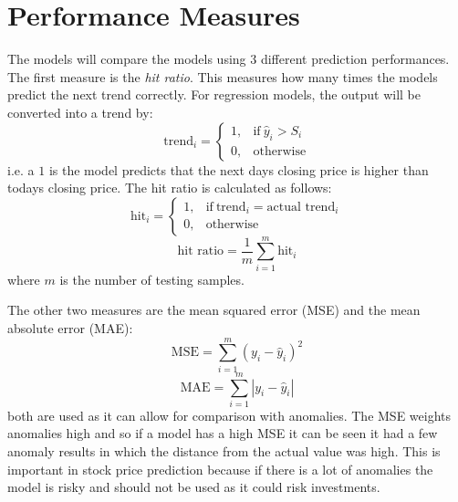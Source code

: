 \documentclass[11pt,a4paper]{article}
\numberwithin{equation}{section}
\begin{document}
\section{Performance Measures}
\label{ss:pm}
The models will compare the models using 3 different prediction performances. The first measure is the {\em hit ratio}. This measures how many times the models predict the next trend correctly. For regression models, the output will be converted into a trend by:
\[
\text{trend}_{i} =
    \begin{cases}
      1, & \text{if}\ \hat{y}_{i} > S_{i} \\
      0, & \text{otherwise}
    \end{cases}
\]
i.e. a $1$ is the model predicts that the next days closing price is higher than todays closing price. The hit ratio is calculated as follows:
\[
\text{hit}_{i} =
    \begin{cases}
      1, & \text{if}\ \text{trend}_{i} = \text{actual trend}_{i} \\
      0, & \text{otherwise}
    \end{cases}
\]
\[
\text{hit ratio} = \frac{1}{m}\sum_{i=1}^{m} \text{hit}_{i}
\]
where $m$ is the number of testing samples.

The other two measures are the mean squared error (MSE) and the mean absolute error (MAE):
\[
\text{MSE} = \sum_{i=1}^{m}(y_{i} - \hat{y}_{i})^2
\]
\[
\text{MAE} = \sum_{i=1}^{m} |y_{i}-\hat{y}_{i}|
\]
both are used as it can allow for comparison with anomalies. The MSE weights anomalies high and so if a model has a high MSE it can be seen it had a few anomaly results in which the distance from the actual value was high. This is important in stock price prediction because if there is a lot of anomalies the model is risky and should not be used as it could risk investments.




\end{document}
